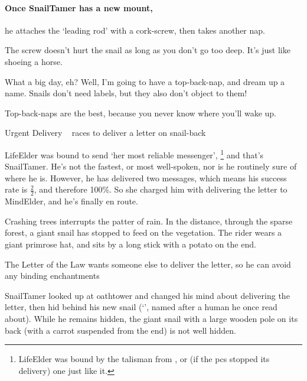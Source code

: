 \paragraph{Once \gls{SnailTamer} has a new mount,}
he attaches the `leading rod' with a cork-screw, then takes another nap.

\begin{speechtext}
  The screw doesn't hurt the snail as long as you don't go too deep.
  It's just like shoeing a horse.

  What a big day, eh?
  Well, I'm going to have a top-back-nap, and dream up a name.
  Snails don't need labels, but they also don't object to them!

  Top-back-naps are the best, because you never know where you'll wake up.
\end{speechtext}

{Urgent Delivery}%
{~ races to deliver a letter on snail-back}%

\Gls{LifeElder} was bound to send `her most reliable messenger',%
\footnote{\Gls{LifeElder} was bound by the \gls{talisman} from , or (if the \glspl{pc} stopped its delivery) one just like it.}
and that's \gls{SnailTamer}.
He's not the fastest, or most well-spoken, nor is he routinely sure of where he is.
However, he has delivered two messages, which means his success rate is $\frac{2}{2}$, and therefore 100\%.
So she charged him with delivering the letter to \gls{MindElder}, and he's finally en route.

\begin{boxtext}
  Crashing trees interrupts the patter of rain.
  In the distance, through the sparse forest, a giant snail has stopped to feed on the vegetation.
  The rider wears a giant primrose hat, and sits by a long stick with a potato on the end.
\end{boxtext}

{The Letter of the Law}%
{ wants someone else to deliver the letter, so he can avoid any binding enchantments}%

\Gls{SnailTamer} looked up at \gls{oathtower} and changed his mind about delivering the letter, then hid behind his new snail (`\composeHumanName', named after a human he once read about).
While he remains hidden, the giant snail with a large wooden pole on its back (with a carrot suspended from the end) is not well hidden.

